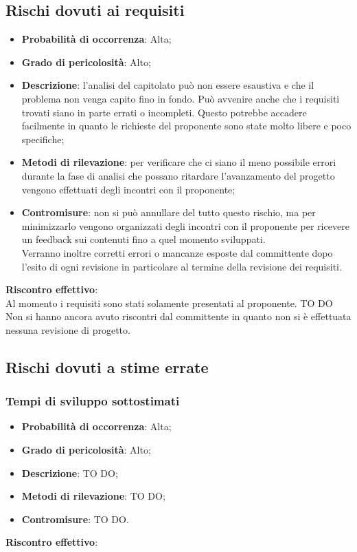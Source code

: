 	\subsection{Rischi dovuti ai requisiti} %
	\label{sub:rischi_dovuti_ai_requisiti}
		\begin{itemize}
			\item \textbf{Probabilità di occorrenza}: Alta;
			\item \textbf{Grado di pericolosità}: Alto;
			\item \textbf{Descrizione}: l'analisi del capitolato può non essere esaustiva e che il problema non venga capito fino in fondo. Può avvenire anche che i requisiti trovati siano in parte errati o incompleti. Questo potrebbe accadere facilmente in quanto le richieste del proponente sono state molto libere e poco specifiche;
			\item \textbf{Metodi di rilevazione}: per verificare che ci siano il meno possibile errori durante la fase di analisi che possano ritardare l'avanzamento del progetto vengono effettuati degli incontri con il proponente;
			\item \textbf{Contromisure}: non si può annullare del tutto questo rischio, ma per minimizzarlo vengono organizzati degli incontri con il proponente per ricevere un feedback sui contenuti fino a quel momento sviluppati. \\
			Verranno inoltre corretti errori o mancanze esposte dal committente dopo l'esito di ogni revisione in particolare al termine della revisione dei requisiti.			
		\end{itemize}
	\noindent
	\textbf{Riscontro effettivo}: \\
	Al momento i requisiti sono stati solamente presentati al proponente. TO DO \\
	Non si hanno ancora avuto riscontri dal committente in quanto non si è effettuata nessuna revisione di progetto.
	
	\subsection{Rischi dovuti a stime errate} %
	\label{sub:rischi_dovuti_a_stime_errate}
		\subsubsection{Tempi di sviluppo sottostimati} %
		\label{ssub:tempi_di_sviluppo_sottostimati}
			\begin{itemize}
				\item \textbf{Probabilità di occorrenza}: Alta;
				\item \textbf{Grado di pericolosità}: Alto;
				\item \textbf{Descrizione}: TO DO;
				\item \textbf{Metodi di rilevazione}: TO DO;
				\item \textbf{Contromisure}: TO DO.
			\end{itemize}
		\noindent
		\textbf{Riscontro effettivo}: \\
		
